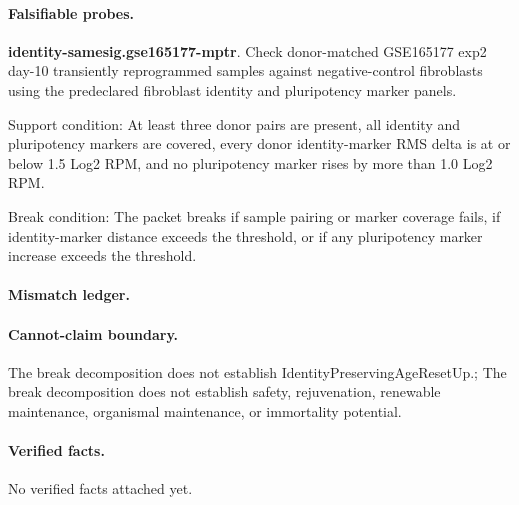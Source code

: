 \paragraph{Falsifiable probes.}
\textbf{identity-samesig.gse165177-mptr}. Check donor-matched GSE165177 exp2 day-10 transiently reprogrammed samples against negative-control fibroblasts using the predeclared fibroblast identity and pluripotency marker panels.

Support condition: At least three donor pairs are present, all identity and pluripotency markers are covered, every donor identity-marker RMS delta is at or below 1.5 Log2 RPM, and no pluripotency marker rises by more than 1.0 Log2 RPM.

Break condition: The packet breaks if sample pairing or marker coverage fails, if identity-marker distance exceeds the threshold, or if any pluripotency marker increase exceeds the threshold.

\paragraph{Mismatch ledger.}
\paragraph{Cannot-claim boundary.} The break decomposition does not establish IdentityPreservingAgeResetUp.; The break decomposition does not establish safety, rejuvenation, renewable maintenance, organismal maintenance, or immortality potential.

\paragraph{Verified facts.}
No verified facts attached yet.
